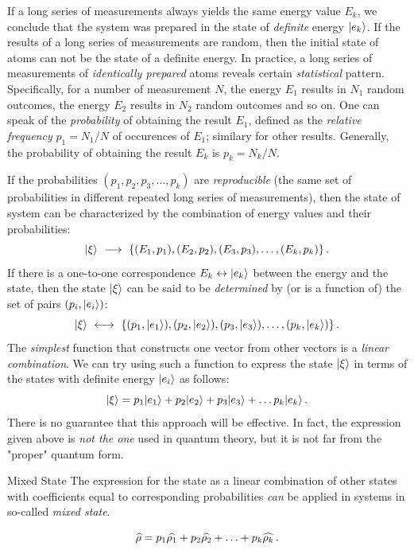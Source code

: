 If a long series of measurements always yields the same energy value $E_k$, we conclude that the system was prepared in the state of \emph{definite} energy $|{e_k}\rangle$. If the results of a long series of measurements are random, then the initial state of atoms can not be the state of a definite energy. In practice, a long series of measurements of \emph{identically prepared} atoms reveals certain \emph{statistical} pattern. Specifically, for a number of measurement $N$, the energy $E_1$ results in $N_1$ random outcomes, the energy $E_2$ results in $N_2$ random outcomes and so on. One can speak of the \emph{probability} of obtaining the result $E_1$, defined as the \emph{relative frequency} $p_1=N_1/N$ of occurences of $E_1$; similary for other results. Generally, the probability of obtaining the result $E_k$ is $p_k=N_k/N$. 

If the probabilities $(p_1, p_2, p_3,\ldots, p_k)$ are
 \emph{reproducible} (the same set of probabilities in different repeated long series of measurements), then the state of system can be characterized by the combination of energy values and their probabilities:
 \[
 |{\xi}\rangle\,\,\longrightarrow\,\, \lbrace(E_1, p_1), (E_2, p_2), (E_3, p_3), \ldots, (E_k, p_k)\rbrace\,.
 \]
If there is a one-to-one correspondence $E_k\leftrightarrow|{e_k}\rangle$ between the energy and the state, then the state $|{\xi}\rangle$ can be said to be \emph{determined} by (or is a function of) the set of pairs $(p_i,|{e_i}\rangle)$:
\[
|{\xi}\rangle\,\,\longleftrightarrow\,\, \lbrace(p_1, |{e_1}\rangle), (p_2, |{e_2}\rangle), (p_3, |{e_3}\rangle), \ldots, (p_k, |{e_k}\rangle)\rbrace\,.
\]
The \emph{simplest} function that constructs one vector from other vectors is a \emph{linear combination}. We can try using such a function to express the state $|{\xi}\rangle$ in terms of the states with definite energy $|{e_i}\rangle$ as follows:
\[
|{\xi}\rangle = p_1|{e_1}\rangle+p_2|{e_2}\rangle+p_3|{e_3}\rangle+\ldots p_k|{e_k}\rangle\,.
\]
There is no guarantee that this approach will be effective. In fact, the expression given above is \emph{not the one} used in quantum theory, but it is not far from the "proper" quantum form. 
\begin{mybio}{Mixed State}
	The expression for the state as a linear combination of other states with coefficients equal to corresponding probabilities \emph{can} be applied in systems in so-called \emph{mixed state}.
	
	\[
		\widehat{\rho} = p_1\widehat{\rho_1}+ p_2\widehat{\rho_2}+\ldots+ p_k\widehat{\rho_k}\,.
	\]
\end{mybio}

